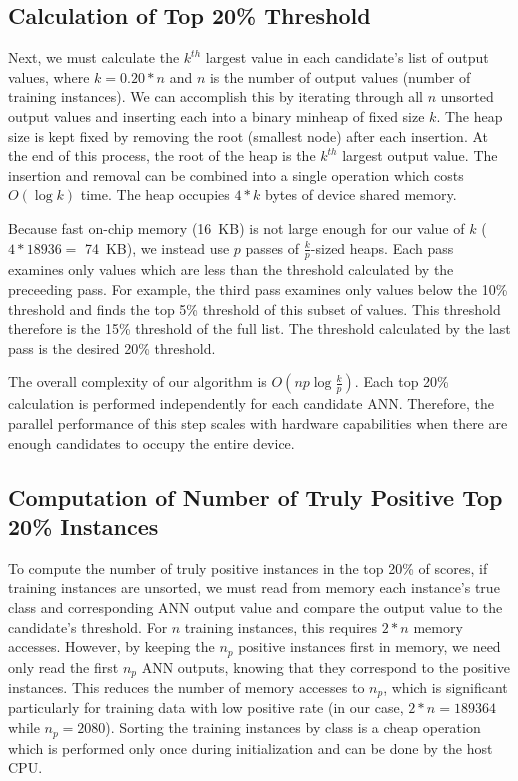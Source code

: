 \documentclass[11pt]{article}       %
\begin{document}
\subsection{Calculation of Top 20\% Threshold} \label{top20}
Next, we must calculate the $k^{th}$ largest value in each candidate's list of output values, where $k = 0.20 * n$ and $n$ is the number of output values (number of training instances). We can accomplish this by iterating through all $n$ unsorted output values and inserting each into a binary minheap of fixed size $k$. The heap size is kept fixed by removing the root (smallest node) after each insertion. At the end of this process, the root of the heap is the $k^{th}$ largest output value. The insertion and removal can be combined into a single operation which costs $O(\log k)$ time. The heap occupies $4 * k$ bytes of device shared memory.

Because fast on-chip memory (16~KB) is not large enough for our value of $k$ ($4 * 18936 =$ 74~KB), we instead use $p$ passes of $\frac{k}{p}$-sized heaps. Each pass examines only values which are less than the threshold calculated by the preceeding pass. For example, the third pass examines only values below the 10\% threshold and finds the top 5\% threshold of this subset of values. This threshold therefore is the 15\% threshold of the full list. The threshold calculated by the last pass is the desired 20\% threshold.

The overall complexity of our algorithm is $O(np \log \frac{k}{p})$. Each top 20\% calculation is performed independently for each candidate ANN. Therefore, the parallel performance of this step scales with hardware capabilities when there are enough candidates to occupy the entire device.

\subsection{Computation of Number of Truly Positive Top 20\% Instances} \label{truepos}
To compute the number of truly positive instances in the top 20\% of scores, if training instances are unsorted, we must read from memory each instance's true class and corresponding ANN output value and compare the output value to the candidate's threshold. For $n$ training instances, this requires $2 * n$ memory accesses. However, by keeping the $n_p$ positive instances first in memory, we need only read the first $n_p$ ANN outputs, knowing that they correspond to the positive instances. This reduces the number of memory accesses to $n_p$, which is significant particularly for training data with low positive rate (in our case, $2 * n = 189364$ while $n_p = 2080$). Sorting the training instances by class is a cheap operation which is performed only once during initialization and can be done by the host CPU.
\end{document}
